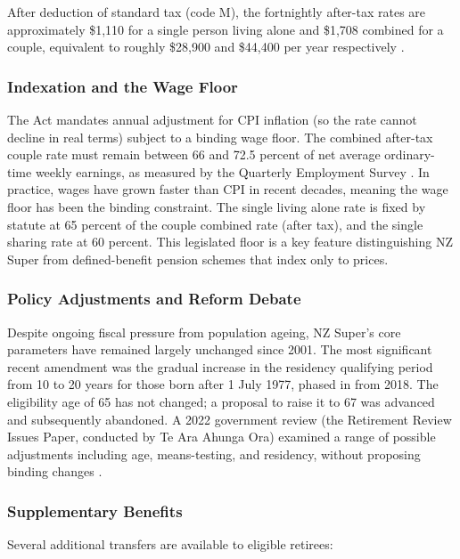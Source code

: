 \documentclass[11pt]{article}
\begin{document}
After deduction of standard tax (code M), the fortnightly after-tax rates are approximately \$1,110 for a single person living alone and \$1,708 combined for a couple, equivalent to roughly \$28,900 and \$44,400 per year respectively \parencite{winz2026benefitRates, winz2026SuperRates}.

\subsubsection*{Indexation and the Wage Floor}

The Act mandates annual adjustment for CPI inflation (so the rate cannot decline in real terms) subject to a binding wage floor. The combined after-tax couple rate must remain between 66 and 72.5 percent of net average ordinary-time weekly earnings, as measured by the Quarterly Employment Survey \parencite[s.~16]{nzsuperAct2001}. In practice, wages have grown faster than CPI in recent decades, meaning the wage floor has been the binding constraint. The single living alone rate is fixed by statute at 65 percent of the couple combined rate (after tax), and the single sharing rate at 60 percent. This legislated floor is a key feature distinguishing NZ Super from defined-benefit pension schemes that index only to prices.

\subsubsection*{Policy Adjustments and Reform Debate}

Despite ongoing fiscal pressure from population ageing, NZ Super's core parameters have remained largely unchanged since 2001. The most significant recent amendment was the gradual increase in the residency qualifying period from 10 to 20 years for those born after 1 July 1977, phased in from 2018. The eligibility age of 65 has not changed; a proposal to raise it to 67 was advanced and subsequently abandoned. A 2022 government review (the Retirement Review Issues Paper, conducted by Te Ara Ahunga Ora) examined a range of possible adjustments including age, means-testing, and residency, without proposing binding changes \parencite{msd2022retirementPolicies}.

\subsubsection*{Supplementary Benefits}

Several additional transfers are available to eligible retirees:
\end{document}

